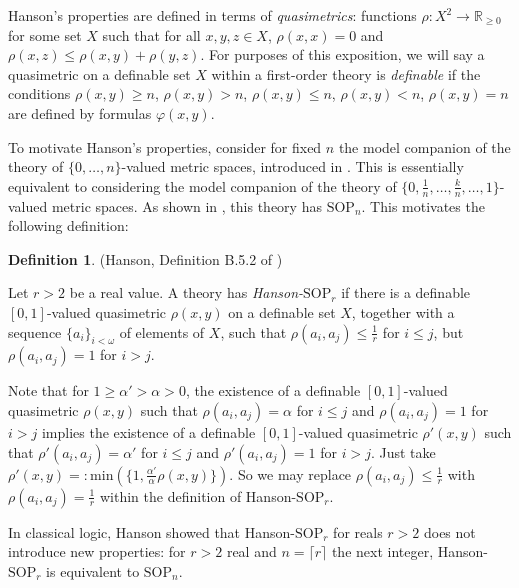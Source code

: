 \documentclass{amsart}
\theoremstyle{definition}
\newtheorem{definition}[theorem]{Definition}
\theoremstyle{remark}
\numberwithin{equation}{section}
\begin{document}
Hanson's properties are defined in terms of \textit{quasimetrics}: functions $\rho: X^{2} \to \mathbb{R}_{\geq 0}$ for some set $X$ such that for all $x, y, z \in X$, $\rho(x, x) = 0$ and $\rho(x, z) \leq \rho(x, y) + \rho (y, z)$. For purposes of this exposition, we will say a quasimetric on a definable set $X$ within a first-order theory is \textit{definable} if the conditions $\rho(x, y) \geq n$, $\rho(x, y) > n$, $\rho(x, y) \leq n$, $\rho(x, y) < n$, $\rho(x, y) = n$ are defined by formulas $\varphi(x, y)$.

To motivate Hanson's properties, consider for fixed $n$ the model companion of the theory of $\{0, \ldots, n\}$-valued metric spaces, introduced in \cite{CW04}. This is essentially equivalent to considering the model companion of the theory of $\{0, \frac{1}{n}, \ldots, \frac{k}{n} , \ldots, 1\}$-valued metric spaces. As shown in \cite{CW04}, this theory has $\mathrm{SOP}_{n}$. This motivates the following definition:

\begin{definition}\label{hanson-sopr}(Hanson, Definition B.5.2 of \cite{Hanson2020})

Let $r > 2$ be a real value. A theory has \textit{Hanson-$\mathrm{SOP}_{r}$} if there is a definable $[0, 1]$-valued quasimetric $\rho(x, y)$ on a definable set $X$, together with a sequence $\{a_{i}\}_{i < \omega}$ of elements of $X$, such that $\rho(a_{i}, a_{j})\leq \frac{1}{r}$ for $i \leq j$, but $\rho(a_{i}, a_{j})= 1$ for $i > j$.
    
\end{definition}


Note that for $1 \geq \alpha' >  \alpha > 0 $, the existence of a definable $[0, 1]$-valued quasimetric $\rho(x, y)$ such that $\rho(a_{i}, a_{j}) = \alpha $ for $i \leq j$ and $\rho(a_{i}, a_{j})= 1$ for $i > j$ implies the existence of a definable $[0, 1]$-valued quasimetric $\rho'(x, y)$ such that $\rho'(a_{i}, a_{j}) = \alpha' $ for $i \leq j$ and $\rho'(a_{i}, a_{j})= 1$ for $i > j$. Just take $\rho'(x, y) = : \mathrm{min}(\{1, \frac{\alpha'}{\alpha}\rho(x, y)\})$. So we may replace $\rho(a_{i}, a_{j})\leq \frac{1}{r}$ with $\rho(a_{i}, a_{j}) = \frac{1}{r}$ within the definition of Hanson-$\mathrm{SOP}_{r}$. 


In classical logic, Hanson showed that Hanson-$\mathrm{SOP}_{r}$ for reals $r > 2$ does not introduce new properties: for $r > 2$ real and $n=\lceil r \rceil$ the next integer, Hanson-$\mathrm{SOP}_{r}$ is equivalent to $\mathrm{SOP}_{n}$.
\end{document}
